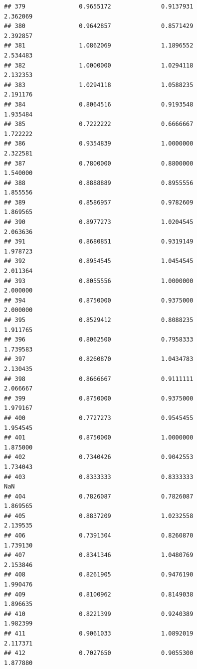 \documentclass[]{article}
\begin{document}
\begin{verbatim}
## 379               0.9655172              0.9137931               2.362069
## 380               0.9642857              0.8571429               2.392857
## 381               1.0862069              1.1896552               2.534483
## 382               1.0000000              1.0294118               2.132353
## 383               1.0294118              1.0588235               2.191176
## 384               0.8064516              0.9193548               1.935484
## 385               0.7222222              0.6666667               1.722222
## 386               0.9354839              1.0000000               2.322581
## 387               0.7800000              0.8800000               1.540000
## 388               0.8888889              0.8955556               1.855556
## 389               0.8586957              0.9782609               1.869565
## 390               0.8977273              1.0204545               2.063636
## 391               0.8680851              0.9319149               1.978723
## 392               0.8954545              1.0454545               2.011364
## 393               0.8055556              1.0000000               2.000000
## 394               0.8750000              0.9375000               2.000000
## 395               0.8529412              0.8088235               1.911765
## 396               0.8062500              0.7958333               1.739583
## 397               0.8260870              1.0434783               2.130435
## 398               0.8666667              0.9111111               2.066667
## 399               0.8750000              0.9375000               1.979167
## 400               0.7727273              0.9545455               1.954545
## 401               0.8750000              1.0000000               1.875000
## 402               0.7340426              0.9042553               1.734043
## 403               0.8333333              0.8333333                    NaN
## 404               0.7826087              0.7826087               1.869565
## 405               0.8837209              1.0232558               2.139535
## 406               0.7391304              0.8260870               1.739130
## 407               0.8341346              1.0480769               2.153846
## 408               0.8261905              0.9476190               1.990476
## 409               0.8100962              0.8149038               1.896635
## 410               0.8221399              0.9240389               1.982399
## 411               0.9061033              1.0892019               2.117371
## 412               0.7027650              0.9055300               1.877880

\end{verbatim}
\end{document}
